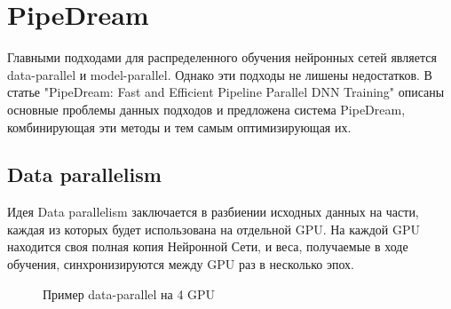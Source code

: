 \newpage
\section{PipeDream}
\indent\setlength{\parindent}{1em} 
Главными подходами для распределенного обучения нейронных сетей является data-parallel и model-parallel. Однако эти подходы не лишены недостатков. В статье "PipeDream: Fast and Efficient Pipeline Parallel DNN Training" описаны основные проблемы данных подходов и предложена система PipeDream, комбинирующая эти методы и тем самым оптимизирующая их.

\subsection{Data parallelism}
Идея Data parallelism заключается в разбиении исходных данных на части, каждая из которых будет использована на отдельной GPU. На каждой GPU находится своя полная копия Нейронной Сети, и веса, получаемые в ходе обучения, синхронизируются между GPU раз в несколько эпох.
\begin{figure}[h]%
	\centering
	\caption{Пример data-parallel на 4 GPU}
	\label{framework} %
\end{figure}

